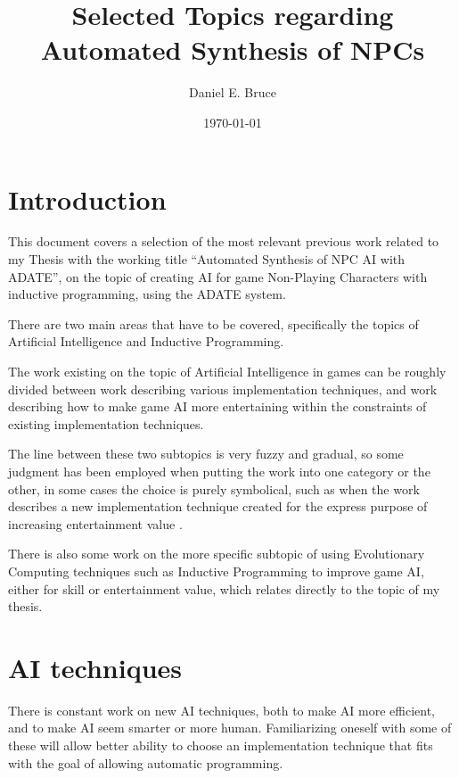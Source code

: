 \documentclass[]{report}
\begin{document}
\title{Selected Topics regarding Automated Synthesis of NPCs}
\author{Daniel E. Bruce}
\date{\today}
\maketitle

\tableofcontents

\chapter{Introduction}
\label{cha:introduction}

This document covers a selection of the most relevant previous work related to
my Thesis with the working title ``Automated Synthesis of NPC AI with ADATE'',
on the topic of creating AI for game Non-Playing Characters with inductive
programming, using the ADATE system.

There are two main areas that have to be covered, specifically the topics of
Artificial Intelligence and Inductive Programming.

The work existing on the topic of Artificial Intelligence in games can be
roughly divided between work describing various implementation techniques, and
work describing how to make game AI more entertaining within the constraints of
existing implementation techniques.

The line between these two subtopics is very fuzzy and gradual, so some judgment
has been employed when putting the work into one category or the other, in some
cases the choice is purely symbolical, such as when the work describes a new
implementation technique created for the express purpose of increasing
entertainment value \citep[for example][]{khoo2002efficient}.

There is also some work on the more specific subtopic of using Evolutionary
Computing techniques such as Inductive Programming to improve game AI, either
for skill or entertainment value, which relates directly to the topic of my
thesis.

\chapter{AI techniques}
\label{cha:ai-techniques}

There is constant work on new AI techniques, both to make AI more efficient, and
to make AI seem smarter or more human. Familiarizing oneself with some of these
will allow better ability to choose an implementation technique that fits with
the goal of allowing automatic programming.
\end{document}
